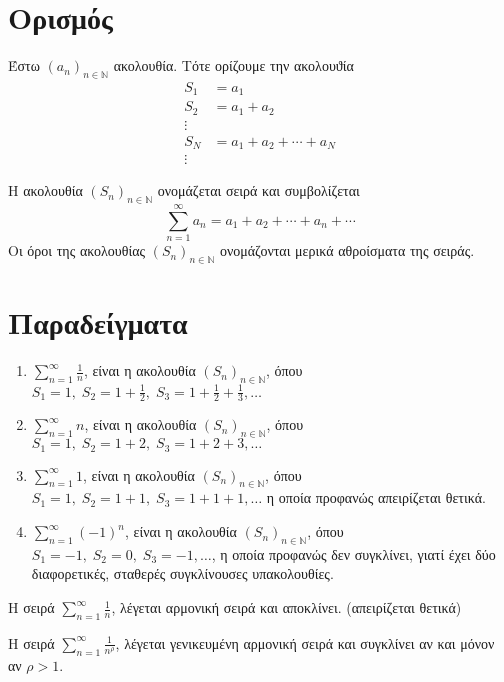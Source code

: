 \documentclass[main.tex]{subfiles}
\begin{document}
\section{Ορισμός}


Έστω $ {(a_{n})}_{n \in \mathbb{N}}$ ακολουθία. Τότε ορίζουμε την ακολουϑία 
\begin{align*}
    S_{1} &= a_{1} \\
    S_{2} &= a_{1}+ a_{2} \\
    \vdots \\
    S_{N} &= a_{1}+ a_{2}+ \cdots + a_{N} \\
    \vdots 
\end{align*}

Η ακολουθία $ {(S_{n})}_{n \in \mathbb{N}} $ ονομάζεται σειρά και συμβολίζεται
\[
    \sum_{n=1}^{\infty} a_{n} = a_{1}+ a_{2}+ \cdots + a_{n} + \cdots   
\] 
Οι όροι της ακολουθίας $ {(S_{n})}_{n \in \mathbb{N}} $ ονομάζονται μερικά αθροίσματα 
της σειράς.

\section{Παραδείγματα}

\begin{enumerate}
    \item $ \sum_{n=1}^{\infty} \frac{1}{n} $, είναι η ακολουθία 
        $ {(S_{n})}_{n \in \mathbb{N}} $, όπου $ S_{1}=1, \; S_{2}=1+ \frac{1}{2}, \; 
        S_{3}= 1 + \frac{1}{2} + \frac{1}{3}, \ldots  $

    \item $ \sum_{n=1}^{\infty} n  $, είναι η ακολουθία ${(S_{n})}_{n \in \mathbb{N}}$,
         όπου $ S_{1}=1, \; S_{2}=1+2, \; S_{3}=1+2+3, \ldots $

    \item $ \sum_{n=1}^{\infty} 1  $, είναι η ακολουθία ${(S_{n})}_{n \in \mathbb{N}}$,
         όπου $ S_{1}=1, \; S_{2}=1+1, \; S_{3}=1+1+1, \ldots $ η οποία προφανώς 
        απειρίζεται θετικά.

    \item $ \sum_{n=1}^{\infty} {(-1)}^{n}  $, είναι η ακολουθία 
        $ {(S_{n})}_{n \in \mathbb{N}} $, όπου $ S_{1}=-1, \; S_{2}=0, \; S_{3}=-1, 
        \ldots $, η οποία προφανώς δεν συγκλίνει, γιατί έχει δύο διαφορετικές, σταθερές 
        συγκλίνουσες υπακολουθίες.
\end{enumerate}

\begin{rems}
\item {}
    \begin{myitemize}
    \item Η σειρά $ \sum_{n=1}^{\infty} \frac{1}{n}  $, λέγεται αρμονική σειρά 
        και αποκλίνει. (απειρίζεται θετικά)
    \item Η σειρά $ \sum_{n=1}^{\infty} \frac{1}{n^{\rho}}  $, λέγεται γενικευμένη 
        αρμονική σειρά και συγκλίνει αν και μόνον αν $ \rho > 1 $.
    \end{myitemize}
\end{rems}
\end{document}
